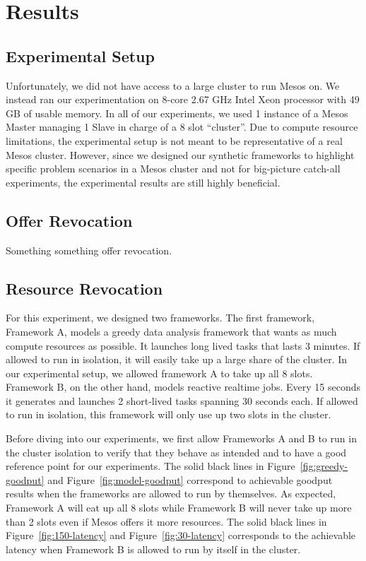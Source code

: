 \section{Results}
\label{sec:results}



\subsection{Experimental Setup}
Unfortunately, we did not have access to a large cluster to run Mesos on. We instead ran our
experimentation on 8-core 2.67 GHz Intel Xeon processor with 49 GB of usable memory. In all of our
experiments, we used 1 instance of a Mesos Master managing 1 Slave in charge of a 8 slot ``cluster''.
Due to compute resource limitations, the experimental setup is not meant to be representative of a real
Mesos cluster. However, since we designed our synthetic frameworks to highlight specific problem 
scenarios in a Mesos cluster and not for big-picture catch-all experiments, the experimental results
are still highly beneficial.

\subsection{Offer Revocation}
Something something offer revocation.

\subsection{Resource Revocation}
For this experiment, we designed two frameworks. The first framework, Framework A, models a greedy
data analysis framework that wants as much compute resources as possible. It launches long lived tasks
that lasts 3 minutes. If allowed to run in isolation, it will easily take up a large share of the 
cluster. In our experimental setup, we allowed framework A to take up all 8 slots. Framework B, on the
other hand, models reactive realtime jobs. Every 15 seconds it generates and launches 2 short-lived 
tasks spanning 30 seconds each. If allowed to run in isolation, this framework will only use up two 
slots in the cluster. 

Before diving into our experiments, we first allow Frameworks A and B to run in the cluster isolation to
verify that they behave as intended and to have a good reference point for our experiments. The solid
black lines in Figure~\ref{fig:greedy-goodput} and Figure~\ref{fig:model-goodput} correspond to 
achievable goodput results when the frameworks are allowed to run by themselves. As expected, 
Framework A will eat up all 8 slots while Framework B will never take up more than 2 slots even if 
Mesos offers it more resources. The solid black lines in Figure~\ref{fig:150-latency} and
Figure~\ref{fig:30-latency} corresponds to the achievable latency when Framework B is allowed to run by
itself in the cluster.

